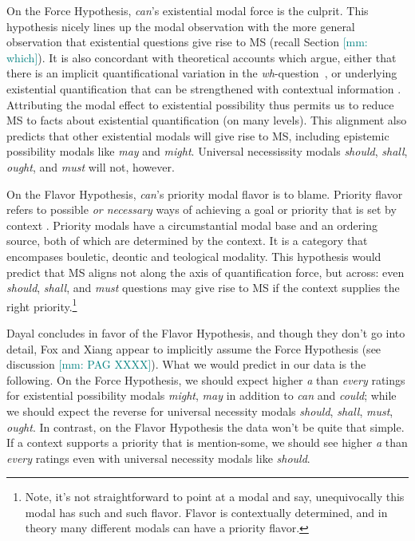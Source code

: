 \documentclass[12pt,letterpaper,table,svgnames,dvipsnames]{article}
\newcommand{\mm}[1]{\textcolor{teal}{[mm: #1]}}
\newcommand{\whq}{\emph{wh}-question~}
\begin{document}
On the Force Hypothesis, \emph{can}'s existential modal force is the culprit. This hypothesis nicely lines up the modal observation with the more general observation that existential questions give rise to MS (recall Section \mm{which}). It is also concordant with theoretical accounts which argue, either that there is an implicit quantificational variation in the \whq \cite{hintikka1976,lahiri2002}, or underlying existential quantification that can be strengthened with contextual information \cite{asherlascarides1998}. Attributing the modal effect to existential possibility thus permits us to reduce MS to facts about existential quantification (on many levels). This alignment also predicts that other existential modals will give rise to MS, including epistemic possibility modals like \emph{may} and \emph{might}. Universal necessissity modals \emph{should}, \emph{shall}, \emph{ought}, and \emph{must} will not, however.

On the Flavor Hypothesis, \emph{can}'s priority modal flavor is to blame. Priority flavor refers to possible \emph{or necessary} ways of achieving a goal or priority that is set by context \cite{portner2009}. Priority modals have a circumstantial modal base and an ordering source, both of which are determined by the context. It is a category that encompases bouletic, deontic and teological modality. This hypothesis would predict that MS aligns not along the axis of quantification force, but across: even \emph{should}, \emph{shall}, and \emph{must} questions may give rise to MS if the context supplies the right priority.\footnote{Note, it's not straightforward to point at a modal and say, unequivocally this modal has such and such flavor. Flavor is contextually determined, and in theory many different modals can have a priority flavor.}


Dayal concludes in favor of the Flavor Hypothesis, and though they don't go into detail, Fox and Xiang appear to implicitly assume the Force Hypothesis (see discussion \mm{PAG XXXX}). What we would predict in our data is the following. On the Force Hypothesis, we should expect higher \emph{a} than \emph{every} ratings for existential possibility modals \emph{might}, \emph{may} in addition to \emph{can} and \emph{could}; while we should expect the reverse for universal necessity modals \emph{should}, \emph{shall}, \emph{must}, \emph{ought}. In contrast, on the Flavor Hypothesis the data won't be quite that simple. If a context supports a priority that is mention-some, we should see higher \emph{a} than \emph{every} ratings even with universal necessity modals like \emph{should}.
\end{document}
